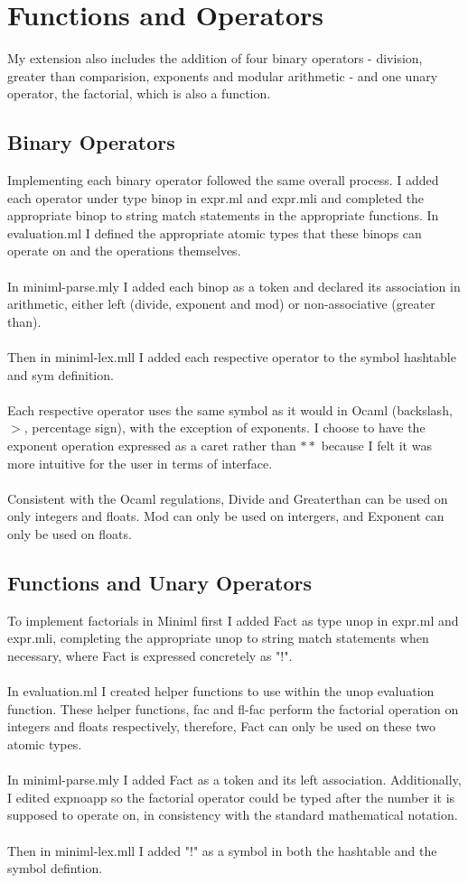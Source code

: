 \documentclass{article}
\begin{document}
\section{Functions and Operators}
My extension also includes the addition of four binary operators - division, greater than comparision, exponents and modular arithmetic - and one unary operator, the factorial, which is also a function.
\subsection{Binary Operators}
Implementing each binary operator followed the same overall process. I added each operator under type binop in expr.ml and expr.mli and completed the appropriate binop to string match statements in the appropriate functions. In evaluation.ml I defined the appropriate atomic types that these binops can operate on and the operations themselves.\\
\\
In miniml-parse.mly I added each binop as a token and declared its association in arithmetic, either left (divide, exponent and mod) or non-associative (greater than).\\
\\
Then in miniml-lex.mll I added each respective operator to the symbol hashtable and sym definition.\\
\\
Each respective operator uses the same symbol as it would in Ocaml (backslash, $>$, percentage sign), with the exception of exponents. I choose to have the exponent operation expressed as a caret rather than $**$ because I felt it was more intuitive for the user in terms of interface.\\
\\
Consistent with the Ocaml regulations, Divide and Greaterthan can be used on only integers and floats. Mod can only be used on intergers, and Exponent can only be used on floats.

\subsection{Functions and Unary Operators}
To implement factorials in Miniml first I added Fact as type unop in expr.ml and expr.mli, completing the appropriate unop to string match statements when necessary, where Fact is expressed concretely as "!".\\
\\
In evaluation.ml I created helper functions to use within the unop evaluation function. These helper functions, fac and fl-fac perform the factorial operation on integers and floats respectively, therefore, Fact can only be used on these two atomic types.\\
\\
In miniml-parse.mly I added Fact as a token and its left association. Additionally, I edited expnoapp so the factorial operator could be typed after the number it is supposed to operate on, in consistency with the standard mathematical notation.\\
\\
Then in miniml-lex.mll I added "!" as a symbol in both the hashtable and the symbol defintion. 
\end{document}
